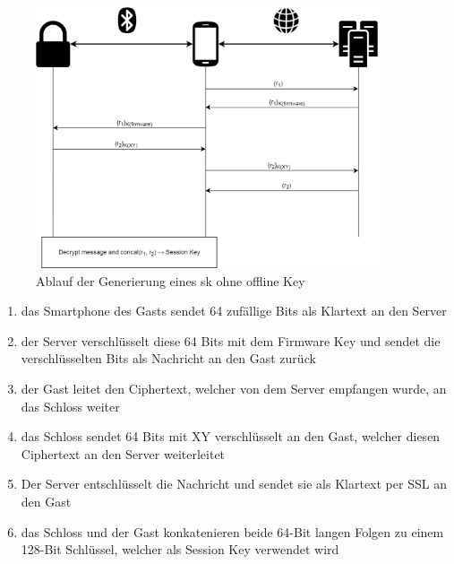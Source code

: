         \begin{figure}[!htbp]
    		\centering
    		\includegraphics[width=0.9\textwidth]{graphics/online_key.png}
    		\caption[Generierung eines Session Keys ohne Offline Key]{Ablauf der Generierung eines \gls{sk} ohne offline Key\cite{Fuller2017}}
    		\label{fig:online_key}
    	\end{figure}
        
        \begin{enumerate}[noitemsep]
            \item das Smartphone des Gasts sendet 64 zufällige Bits als Klartext an den Server
            \item der Server verschlüsselt diese 64 Bits mit dem Firmware Key und sendet die verschlüsselten Bits als Nachricht an den Gast zurück
            \item der Gast leitet den Ciphertext, welcher von dem Server empfangen wurde, an das Schloss weiter
            \item das Schloss sendet 64 Bits mit XY verschlüsselt an den Gast, welcher diesen Ciphertext an den Server weiterleitet
            \item Der Server entschlüsselt die Nachricht und sendet sie als Klartext per SSL an den Gast
            \item das Schloss und der Gast konkatenieren beide 64-Bit langen Folgen zu einem 128-Bit Schlüssel, welcher als Session Key verwendet wird
        \end{enumerate}
